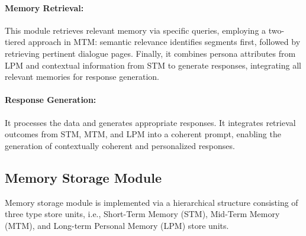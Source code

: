 \documentclass[11pt]{article}
\begin{document}
\paragraph{Memory Retrieval:} This module retrieves relevant memory via specific queries, employing a two-tiered approach in MTM: semantic relevance identifies segments first, followed by retrieving pertinent dialogue pages. Finally, it combines persona attributes from LPM and contextual information from STM to generate responses, integrating all relevant memories for response generation.
\paragraph{Response Generation:} It processes the data and generates appropriate responses. It integrates retrieval outcomes from STM, MTM, and LPM into a coherent prompt, enabling the generation of contextually coherent and personalized responses.




\subsection{Memory Storage Module}
Memory storage module is implemented via a hierarchical structure consisting of three type store units, i.e., Short-Term Memory (STM), Mid-Term Memory (MTM), and Long-term Personal Memory (LPM) store units. 
\end{document}
